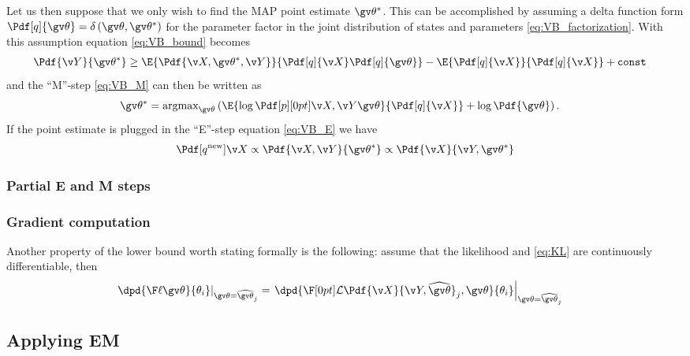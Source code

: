 Let us then suppose that we only wish to find the MAP point estimate $\Th^*$. This can be accomplished
by assuming a delta function form $\Pdf[q]{\Th}=\delta\left(\Th,\Th^*\right)$ for the parameter factor in the
joint distribution of states and parameters \eqref{eq:VB_factorization}.
With this assumption equation \eqref{eq:VB_bound} becomes
\begin{align}
	\Pdf{\Y}{\Th^*} &\geq \E{\Pdf{\X,\Th^*,\Y}}{\Pdf[q]{\X}\Pdf[q]{\Th}} - \E{\Pdf[q]{\X}}{\Pdf[q]{\X}} + \mathtt{const}
	\label{eq:VB_MAP_boundl}
\end{align}
and the ``M''-step \eqref{eq:VB_M} can then be written as
\begin{align}
	\Th^* &= \text{argmax}_{\Th}\left(\E{\log\cLH}{\Pdf[q]{\X}}+\log\Pdf{\Th}\right).
	\label{tablelabel}
\end{align}
If the point estimate is plugged in the ``E''-step equation \eqref{eq:VB_E} we have
\begin{align}
	\Pdf[q^{\text{new}}]{\X}\propto \Pdf{\X,\Y}{\Th^*} \propto \Pdf{\X}{\Y,\Th^*} 
	\label{tablelabel}
\end{align}

\subsubsection{Partial E and M steps}


\subsubsection{Gradient computation}
Another property of the lower bound worth stating formally is the following: assume that
the likelihood and \eqref{eq:KL} are continuously differentiable, then
\begin{align}
		\left.\dpd{\lLH}{\theta_i}\right|_{\Th=\widehat\Th_j}&=\left.\dpd{\LB{\Pdf{\X}{\Y,\widehat\Th}_j,\Th}}{\theta_i}\right|_{\Th=\widehat\Th_j} \label{eq:EM_gradients}
\end{align}

\subsection{Applying EM}%


